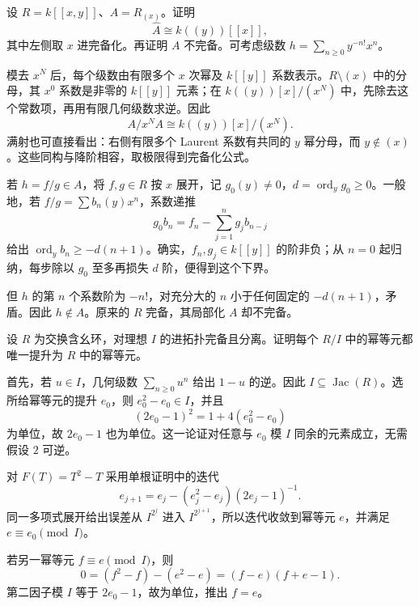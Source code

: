 \begin{exercise}\label{g5:ex:localization-of-complete-ring}
	设 \(R=k[[x,y]]\)、\(A=R_{(x)}\)。证明
	\[
		\widehat A\cong k((y))[[x]],
	\]
	其中左侧取 \(x\) 进完备化。再证明 \(A\) 不完备。可考虑级数
	\(h=\sum_{n\geq0}y^{-n!}x^n\)。
\end{exercise}
\begin{solution}
	模去 \(x^N\) 后，每个级数由有限多个 \(x\) 次幂及 \(k[[y]]\) 系数表示。\(R\setminus(x)\) 中的分母，其 \(x^0\) 系数是非零的 \(k[[y]]\) 元素；在 \(k((y))[x]/(x^N)\) 中，先除去这个常数项，再用有限几何级数求逆。因此
	\[
		A/x^NA\cong k((y))[x]/(x^N).
	\]
	满射也可直接看出：右侧有限多个 Laurent 系数有共同的 \(y\) 幂分母，而 \(y\notin(x)\)。这些同构与降阶相容，取极限得到完备化公式。

	若 \(h=f/g\in A\)，将 \(f,g\in R\) 按 \(x\) 展开，记 \(g_0(y)\ne0\)，\(d=\operatorname{ord}_y g_0\geq0\)。一般地，若
	\(f/g=\sum b_n(y)x^n\)，系数递推
	\[
		g_0b_n=f_n-\sum_{j=1}^n g_jb_{n-j}
	\]
	给出 \(\operatorname{ord}_y b_n\geq-d(n+1)\)。确实，\(f_n,g_j\in k[[y]]\) 的阶非负；从 \(n=0\) 起归纳，每步除以 \(g_0\) 至多再损失 \(d\) 阶，便得到这个下界。

	但 \(h\) 的第 \(n\) 个系数阶为 \(-n!\)，对充分大的 \(n\) 小于任何固定的 \(-d(n+1)\)，矛盾。因此 \(h\notin A\)。原来的 \(R\) 完备，其局部化 \(A\) 却不完备。
\end{solution}

\begin{exercise}\label{g5:ex:idempotent-lifting-complete}
	设 \(R\) 为交换含幺环，对理想 \(I\) 的进拓扑完备且分离。证明每个 \(R/I\) 中的幂等元都唯一提升为 \(R\) 中的幂等元。
\end{exercise}
\begin{solution}
	首先，若 \(u\in I\)，几何级数 \(\sum_{n\geq0}u^n\) 给出 \(1-u\) 的逆。因此 \(I\subseteq\operatorname{Jac}(R)\)。选所给幂等元的提升 \(e_0\)，则 \(e_0^2-e_0\in I\)，并且
	\[
		(2e_0-1)^2=1+4(e_0^2-e_0)
	\]
	为单位，故 \(2e_0-1\) 也为单位。这一论证对任意与 \(e_0\) 模 \(I\) 同余的元素成立，无需假设 \(2\) 可逆。

	对 \(F(T)=T^2-T\) 采用单根证明中的迭代
	\[
		e_{j+1}=e_j-(e_j^2-e_j)(2e_j-1)^{-1}.
	\]
	同一多项式展开给出误差从 \(I^{2^j}\) 进入 \(I^{2^{j+1}}\)，所以迭代收敛到幂等元 \(e\)，并满足 \(e\equiv e_0\pmod I\)。

	若另一幂等元 \(f\equiv e\pmod I\)，则
	\[
		0=(f^2-f)-(e^2-e)=(f-e)(f+e-1).
	\]
	第二因子模 \(I\) 等于 \(2e_0-1\)，故为单位，推出 \(f=e\)。
\end{solution}

